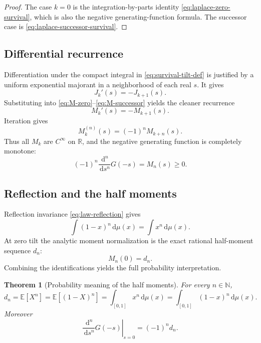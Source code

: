 \documentclass[11pt,oneside]{article}
\newtheorem{theorem}{Theorem}[section]
\theoremstyle{definition}
\theoremstyle{remark}
\newcommand{\R}{\mathbb R}
\newcommand{\N}{\mathbb N}
\newcommand{\dd}{\,\mathrm d}
\newcommand{\E}{\mathbb E}
\begin{document}
\begin{proof}
The case $k=0$ is the integration-by-parts identity
\eqref{eq:laplace-zero-survival}, which is also the negative generating-function formula.
The successor case is \eqref{eq:laplace-successor-survival}.
\end{proof}

\subsection{Differential recurrence}

Differentiation under the compact integral in \eqref{eq:survival-tilt-def} is justified by a
uniform exponential majorant in a neighborhood of each real $s$.  It gives
\begin{equation}
 J_k'(s)=-J_{k+1}(s).
 \label{eq:J-differential-recurrence}
\end{equation}
Substituting into \eqref{eq:M-zero}--\eqref{eq:M-successor} yields the cleaner recurrence
\begin{equation}
 M_k'(s)=-M_{k+1}(s).
 \label{eq:M-differential-recurrence}
\end{equation}
Iteration gives
\begin{equation}
 M_k^{(n)}(s)=(-1)^nM_{k+n}(s).
 \label{eq:M-iterated-derivative}
\end{equation}
Thus all $M_k$ are $C^\infty$ on $\R$, and the negative generating function is completely
monotone:
\begin{equation}
 (-1)^n\frac{\dd^n}{\dd s^n}G(-s)=M_n(s)\ge0.
 \label{eq:complete-monotonicity}
\end{equation}

\subsection{Reflection and the half moments}

Reflection invariance \eqref{eq:law-reflection} gives
\begin{equation}
 \int(1-x)^n\dd\mu(x)=\int x^n\dd\mu(x).
 \label{eq:endpoint-raw-reflection}
\end{equation}
At zero tilt the analytic moment normalization is the exact rational half-moment sequence
$d_n$:
\begin{equation}
 M_n(0)=d_n.
 \label{eq:M-zero-half-moment}
\end{equation}
Combining the identifications yields the full probability interpretation.

\begin{theorem}[Probability meaning of the half moments]
\label{thm:half-moments-probability}
For every $n\in\N$,
\begin{equation}
 d_n=\E[X^n]=\E[(1-X)^n]
     =\int_{[0,1]}x^n\dd\mu(x)
     =\int_{[0,1]}(1-x)^n\dd\mu(x).
 \label{eq:half-moment-probability}
\end{equation}
Moreover
\begin{equation}
 \left.\frac{\dd^n}{\dd s^n}G(-s)\right|_{s=0}=(-1)^nd_n.
 \label{eq:generating-jet-half-moments}
\end{equation}
\end{theorem}
\end{document}

